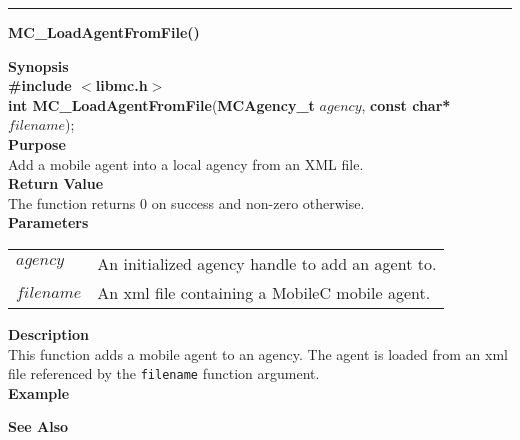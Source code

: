 \noindent
\vspace{5pt}
\rule{6.5in}{0.015in}
\noindent
{}
{\LARGE \bf MC\_LoadAgentFromFile()}\\
\label{api:MC_LoadAgentFromFile()}

\noindent
{\bf Synopsis}\\
{\bf \#include $<$libmc.h$>$}\\
{\bf int MC\_LoadAgentFromFile}({\bf MCAgency\_t} $agency$, {\bf const char*} $filename$);\\

\noindent
{\bf Purpose}\\
Add a mobile agent into a local agency from an XML file.\\

\noindent
{\bf Return Value}\\
The function returns 0 on success and non-zero otherwise.\\

\noindent
{\bf Parameters}
\vspace{-0.1in}
\begin{description}
\item
\begin{tabular}{p{10 mm}p{145 mm}} 
$agency$ & An initialized agency handle to add an agent to.\\
$filename$ & An xml file containing a MobileC mobile agent.
\end{tabular}
\end{description}

\noindent
{\bf Description}\\
This function adds a mobile agent to an agency. The agent is loaded from 
an xml file referenced by the \texttt{filename} function argument. \\

\noindent
{\bf Example}\\
\noindent
{\footnotesize}

\noindent
{\bf See Also}\\

